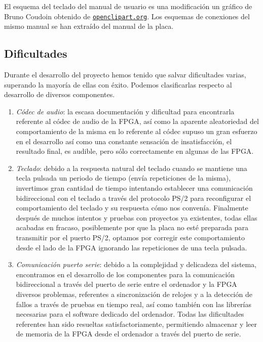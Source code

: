 \documentclass{article}
\begin{document}
	\medskip El esquema del teclado del manual de usuario es una modificación un gráfico de Bruno Coudoin obtenido de \href{http://openclipart.org}{\nolinkurl{openclipart.org}}. Los esquemas de conexiones del mismo manual se han extraído del manual de la placa.

\subsection{Dificultades}
	Durante el desarrollo del proyecto hemos tenido que salvar dificultades varias, superando la mayoría de ellas con éxito. Podemos clasificarlas respecto al desarrollo de diversos componentes.

\begin{enumerate}
	\item {\itshape Códec de audio}: la escasa documentación y dificultad para encontrarla referente al códec de audio de la FPGA, así como la aparente aleatoriedad del comportamiento de la misma en lo referente al códec supuso un gran esfuerzo en el desarrollo así como una constante sensación de insatisfacción, el resultado final, es audible, pero sólo correctamente en algunas de las FPGA.

	\item {\itshape Teclado}: debido a la respuesta natural del teclado cuando se mantiene una tecla pulsada un periodo de tiempo (envía repeticiones de la misma), invertimos gran cantidad de tiempo intentando establecer una comunicación bidireccional con el teclado a través del protocolo PS/2 para reconfigurar el comportamiento del teclado y su respuesta cómo nos convenía. Finalmente después de muchos intentos y pruebas con proyectos ya existentes, todas ellas acabadas en fracaso, posiblemente por que la placa no esté preparada para transmitir por el puerto PS/2, optamos por corregir este comportamiento desde el lado de la FPGA ignorando las repeticiones de una tecla pulsada.

	\item {\itshape Comunicación puerto serie}: debido a la complejidad y delicadeza del sistema, encontramos en el desarrollo de los componentes para la comunicación bidireccional a través del puerto de serie entre el ordenador y la FPGA diversos problemas, referentes a sincronización de relojes y a la detección de fallos a través de pruebas en tiempo real, así como también con las librerías necesarias para el software dedicado del ordenador.
	Todas las dificultades referentes han sido resueltas satisfactoriamente, permitiendo almacenar y leer de memoria de la FPGA desde el ordenador a través del puerto de serie.
\end{enumerate}
\end{document}

